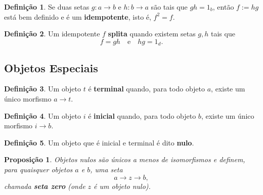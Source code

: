 \documentclass{article}
\theoremstyle{plain}                    %
\newtheorem*{proposition}{Proposição}
\theoremstyle{definition}
\newtheorem*{definition}{Definição}
\theoremstyle{remark}
\begin{document}
\begin{adendo}
\begin{definition}
Se duas setas $g: a \to b$ e $h: b \to a$ são tais que $gh = 1_b$, então $f := hg$ está bem definido e é um \textbf{idempotente}, isto é, $f^2 = f$.
\end{definition}

\begin{definition}
Um idempotente $f$ \textbf{splita} quando existem setas $g,h$ tais que
$$f = gh \quad \text{e} \quad hg = 1_d.$$
\end{definition}

\subsection*{Objetos Especiais}

\begin{definition}
Um objeto $t$ é \textbf{terminal} quando, para todo objeto $a$, existe um único morfismo $a \to t$.
\end{definition}

\begin{definition}
Um objeto $i$ é \textbf{inicial} quando, para todo objeto $b$, existe um único morfismo $i \to b$.
\end{definition}

\begin{definition}
Um objeto que é inicial e terminal é dito \textbf{nulo}.
\end{definition}

\begin{proposition}
Objetos nulos são únicos a menos de isomorfismos e definem, para quaisquer objetos $a$ e $b$, uma seta
$$a \to z \to b,$$
chamada \textbf{seta zero} (onde $z$ é um objeto nulo).
\end{proposition}

\end{adendo}
\end{document}
